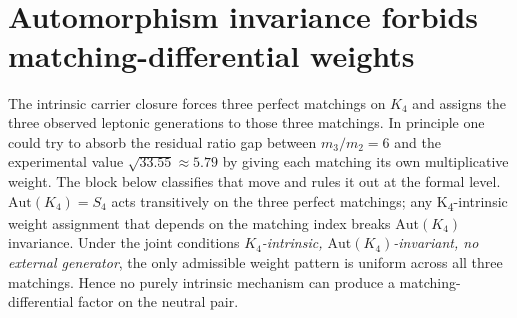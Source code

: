 \documentclass[11pt]{article}
\begin{document}
\begin{code}
\AgdaSpace{}%
\<%
\\
%
\>[2]\AgdaSymbol{;}\AgdaSpace{}%
%
\>[35]\AgdaSymbol{=}\AgdaSpace{}%
\<%
\\
%
\>[2]\AgdaSymbol{;}\AgdaSpace{}%
%
\>[35]\AgdaSymbol{=}\AgdaSpace{}%
\<%
\\
%
\>[2]\AgdaSymbol{;}\AgdaSpace{}%
%
\>[35]\AgdaSymbol{=}\AgdaSpace{}%
\<%
\\
%
\>[2]\AgdaSymbol{;}\AgdaSpace{}%
%
\>[35]\AgdaSymbol{=}\AgdaSpace{}%
\<%
\\
%
\>[2]\AgdaSymbol{;}\AgdaSpace{}%
%
\>[37]\AgdaSymbol{=}\AgdaSpace{}%
\<%
\\
%
\>[2]\AgdaSymbol{;}\AgdaSpace{}%
\AgdaSpace{}%
\AgdaSymbol{=}\AgdaSpace{}%
\<%
\\
%
\>[2]\AgdaSymbol{;}\AgdaSpace{}%
%
\>[39]\AgdaSymbol{=}\AgdaSpace{}%
\<%
\\
%
\>[2]\AgdaSymbol{;}\AgdaSpace{}%
\AgdaSpace{}%
\AgdaSymbol{=}\AgdaSpace{}%
\<%
\\
%
\>[2]\AgdaSymbol{\}}\<%
\end{code}

\section{Automorphism invariance forbids matching-differential weights}

The intrinsic carrier closure forces three perfect matchings on $K_4$
and assigns the three observed leptonic generations to those three
matchings.  In principle one could try to absorb the residual ratio
gap between $m_3/m_2 = 6$ and the experimental value $\sqrt{33.55}
\approx 5.79$ by giving each matching its own multiplicative weight.
The block below classifies that move and rules it out at the formal
level.  $\mathrm{Aut}(K_4) = S_4$ acts transitively on the three
perfect matchings; any K\textsubscript{4}-intrinsic weight assignment
that depends on the matching index breaks $\mathrm{Aut}(K_4)$
invariance.  Under the joint conditions
\emph{$K_4$-intrinsic, $\mathrm{Aut}(K_4)$-invariant, no external
generator}, the only admissible weight pattern is uniform across all
three matchings.  Hence no purely intrinsic mechanism can produce a
matching-differential factor on the neutral pair.
\end{document}
